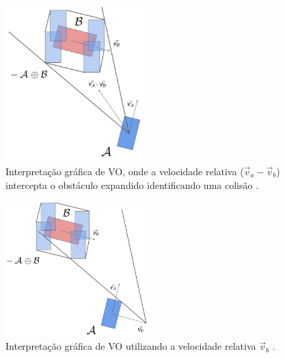         \begin{figure}
            \centering
            \includegraphics[width=0.5\textwidth]{fig/chap2/cone_shaped.png}
            \caption{Interpretação gráfica de VO, onde a velocidade relativa ($\vec{v}_a - \vec{v}_b$) intercepta o obstáculo expandido identificando uma colisão \cite{KUWATA2014110}.}
            \label{fig:cone_shaped}
        \end{figure}
        
        \begin{figure}
            \centering
            \includegraphics[width=0.5\textwidth]{fig/chap2/vo.png}
            \caption{Interpretação gráfica de VO utilizando a velocidade relativa $\vec{v}_b$ \cite{KUWATA2014110}.}
            \label{fig:vo}
        \end{figure}
        
